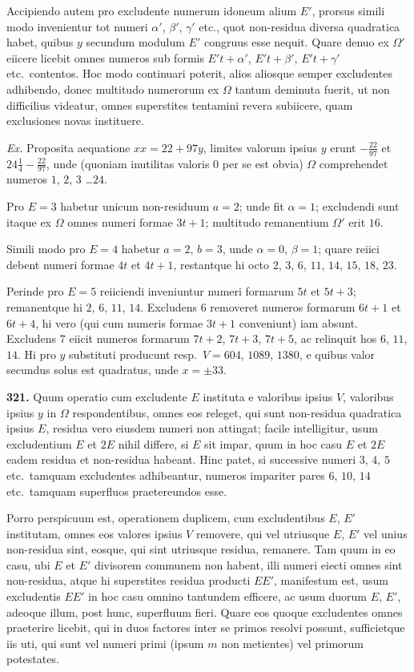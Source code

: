 \documentclass[12pt,a4paper]{article}
\theoremstyle{plain}
\theoremstyle{definition}
\theoremstyle{remark}
\begin{document}
Accipiendo autem pro excludente numerum idoneum alium $E'$, prorsus simili modo invenientur tot numeri $\alpha'$, $\beta'$, $\gamma'$ etc., quot non-residua diversa quadratica habet, quibus $y$ secundum modulum $E'$ congruus esse nequit. Quare denuo ex $\Omega'$ eiicere licebit omnes numeros sub formis $E't + \alpha'$, $E't + \beta'$, $E't + \gamma'$ etc.~contentos. Hoc modo continuari poterit, alios aliosque semper excludentes adhibendo, donec multitudo numerorum ex $\Omega$ tantum deminuta fuerit, ut non difficilius videatur, omnes superstites tentamini revera subiicere, quam exclusiones novas instituere.

\textit{Ex.} Proposita aequatione $xx = 22 + 97y$, limites valorum ipsius $y$ erunt $-\frac{22}{97}$ et $24\tfrac{1}{4} - \frac{22}{97}$, unde (quoniam inutilitas valoris $0$ per se est obvia) $\Omega$ comprehendet numeros $1$, $2$, $3$ \ldots $24$.

Pro $E = 3$ habetur unicum non-residuum $a = 2$; unde fit $\alpha = 1$; excludendi sunt itaque ex $\Omega$ omnes numeri formae $3t + 1$; multitudo remanentium $\Omega'$ erit $16$.

Simili modo pro $E = 4$ habetur $a = 2$, $b = 3$, unde $\alpha = 0$, $\beta = 1$; quare reiici debent numeri formae $4t$ et $4t+1$, restantque hi octo $2$, $3$, $6$, $11$, $14$, $15$, $18$, $23$.

Perinde pro $E = 5$ reiiciendi inveniuntur numeri formarum $5t$ et $5t+3$; remanentque hi $2$, $6$, $11$, $14$. Excludens $6$ removeret numeros formarum $6t+1$ et $6t+4$, hi vero (qui cum numeris formae $3t+1$ conveniunt) iam absunt. Excludens $7$ eiicit numeros formarum $7t+2$, $7t+3$, $7t+5$, ac relinquit hos $6$, $11$, $14$. Hi pro $y$ substituti producunt resp.~$V = 604$, $1089$, $1380$, e quibus valor secundus solus est quadratus, unde $x = \pm 33$.

\textbf{321.} Quum operatio cum excludente $E$ instituta e valoribus ipsius $V$, valoribus ipsius $y$ in $\Omega$ respondentibus, omnes eos releget, qui sunt non-residua quadratica ipsius $E$, residua vero eiusdem numeri non attingat; facile intelligitur, usum excludentium $E$ et $2E$ nihil differe, si $E$ sit impar, quum in hoc casu $E$ et $2E$ eadem residua et non-residua habeant. Hinc patet, si successive numeri $3$, $4$, $5$ etc.~tamquam excludentes adhibeantur, numeros impariter pares $6$, $10$, $14$ etc.~tamquam superfluos praetereundos esse.

Porro perspicuum est, operationem duplicem, cum excludentibus $E$, $E'$ institutam, omnes eos valores ipsius $V$ removere, qui vel utriusque $E$, $E'$ vel unius non-residua sint, eosque, qui sint utriusque residua, remanere. Tam quum in eo casu, ubi $E$ et $E'$ divisorem communem non habent, illi numeri eiecti omnes sint non-residua, atque hi superstites residua producti $EE'$, manifestum est, usum excludentis $EE'$ in hoc casu omnino tantundem efficere, ac usum duorum $E$, $E'$, adeoque illum, post hunc, superfluum fieri. Quare eos quoque excludentes omnes praeterire licebit, qui in duos factores inter se primos resolvi possunt, sufficietque iis uti, qui sunt vel numeri primi (ipsum $m$ non metientes) vel primorum potestates.
\end{document}
